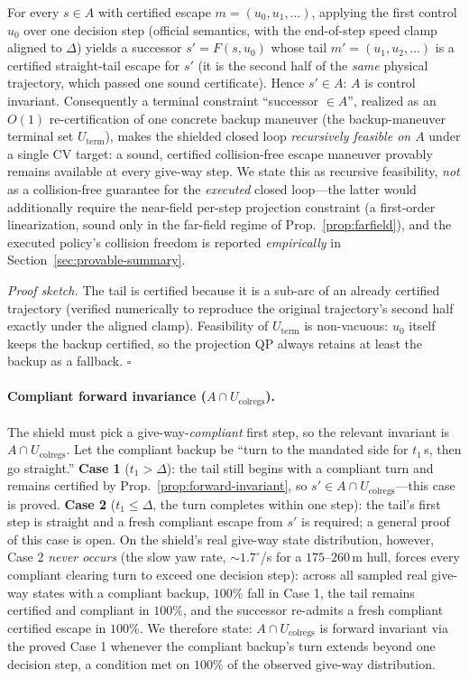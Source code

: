 \begin{proposition}
\label{prop:forward-invariant}
For every $s\in A$ with certified escape $m=(u_0,u_1,\dots)$, applying the first
control $u_0$ over one decision step (official semantics, with the end-of-step speed
clamp aligned to $\Delta$) yields a successor $s'=F(s,u_0)$ whose tail
$m'=(u_1,u_2,\dots)$ is a certified straight-tail escape for $s'$ (it is the second
half of the \emph{same} physical trajectory, which passed one sound certificate).
Hence $s'\in A$: $A$ is control invariant. Consequently a terminal constraint
``successor $\in A$'', realized as an $O(1)$ re-certification of one concrete backup
maneuver (the backup-maneuver terminal set $U_{\mathrm{term}}$), makes the shielded
closed loop \emph{recursively feasible on $A$} under a single CV target: a sound,
certified collision-free escape maneuver provably remains available at every give-way
step. We state this as recursive feasibility, \emph{not} as a collision-free guarantee
for the \emph{executed} closed loop---the latter would additionally require the
near-field per-step projection constraint (a first-order linearization, sound only in
the far-field regime of Prop.~\ref{prop:farfield}), and the executed policy's collision
freedom is reported \emph{empirically} in Section~\ref{sec:provable-summary}.
\end{proposition}
\emph{Proof sketch.} The tail is certified because it is a sub-arc of an already
certified trajectory (verified numerically to reproduce the original trajectory's
second half exactly under the aligned clamp). Feasibility of $U_{\mathrm{term}}$ is
non-vacuous: $u_0$ itself keeps the backup certified, so the projection QP always
retains at least the backup as a fallback. $\square$

\paragraph{Compliant forward invariance ($A\cap U_{\mathrm{colregs}}$).}
The shield must pick a give-way-\emph{compliant} first step, so the relevant invariant
is $A\cap U_{\mathrm{colregs}}$. Let the compliant backup be ``turn to the mandated
side for $t_1$\,s, then go straight.'' \textbf{Case 1} ($t_1>\Delta$): the tail still
begins with a compliant turn and remains certified by
Prop.~\ref{prop:forward-invariant}, so $s'\in A\cap U_{\mathrm{colregs}}$---this case
is proved. \textbf{Case 2} ($t_1\le\Delta$, the turn completes within one step): the
tail's first step is straight and a fresh compliant escape from $s'$ is required; a
general proof of this case is open. On the shield's real give-way state distribution,
however, Case 2 \emph{never occurs} (the slow yaw rate, $\sim\!1.7^\circ$/s for a
$175$--$260$\,m hull, forces every compliant clearing turn to exceed one decision
step): across all sampled real give-way states with a compliant backup, $100\%$ fall
in Case 1, the tail remains certified and compliant in $100\%$, and the successor
re-admits a fresh compliant certified escape in $100\%$. We therefore state:
$A\cap U_{\mathrm{colregs}}$ is forward invariant via the proved Case 1 whenever the
compliant backup's turn extends beyond one decision step, a condition met on $100\%$
of the observed give-way distribution.

